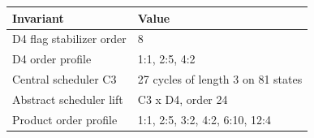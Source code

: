 \begin{center}\small
\begin{tabular}{ll}
\toprule
Invariant & Value\\
\midrule
D4 flag stabilizer order & 8\\
D4 order profile & 1:1, 2:5, 4:2\\
Central scheduler C3 & 27 cycles of length 3 on 81 states\\
Abstract scheduler lift & C3 x D4, order 24\\
Product order profile & 1:1, 2:5, 3:2, 4:2, 6:10, 12:4\\
\bottomrule
\end{tabular}
\end{center}

